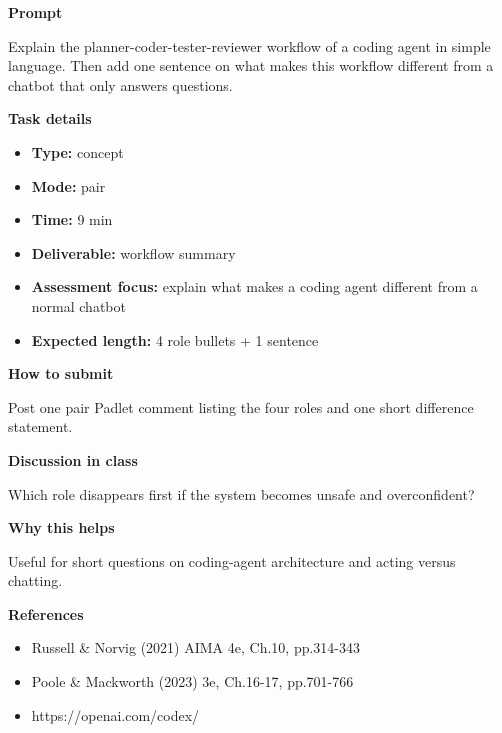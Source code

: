 \documentclass[11pt]{article}
\begin{document}
\begin{tcolorbox}[colback=white,colframe=MidnightBlue,title={Q1 Core Concept Check},fonttitle=\bfseries,breakable]
\begin{center}
\end{center}

{\large\bfseries\color{MidnightBlue} Prompt}\par\medskip
Explain the planner-coder-tester-reviewer workflow of a coding agent in simple language. Then add one sentence on what makes this workflow different from a chatbot that only answers questions.

{\large\bfseries\color{MidnightBlue} Task details}\par\medskip
\begin{itemize}\item \textbf{Type:} concept
\item \textbf{Mode:} pair
\item \textbf{Time:} 9 min
\item \textbf{Deliverable:} workflow summary
\item \textbf{Assessment focus:} explain what makes a coding agent different from a normal chatbot
\item \textbf{Expected length:} 4 role bullets + 1 sentence\end{itemize}

{\large\bfseries\color{MidnightBlue} How to submit}\par\medskip
Post one pair Padlet comment listing the four roles and one short difference statement.

{\large\bfseries\color{MidnightBlue} Discussion in class}\par\medskip
Which role disappears first if the system becomes unsafe and overconfident?

{\large\bfseries\color{MidnightBlue} Why this helps}\par\medskip
Useful for short questions on coding-agent architecture and acting versus chatting.

{\large\bfseries\color{MidnightBlue} References}\par\medskip
\begin{itemize}\item Russell \& Norvig (2021) AIMA 4e, Ch.10, pp.314-343
\item Poole \& Mackworth (2023) 3e, Ch.16-17, pp.701-766
\item https://openai.com/codex/\end{itemize}
\end{tcolorbox}
\end{document}
